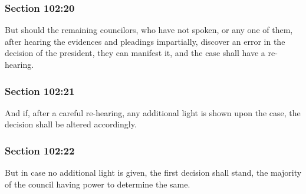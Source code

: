 	\subsubsection{Section 102:20} %
		\label{DC102-20}

		But should the remaining councilors, who have not spoken, or any one of them, after hearing the evidences and pleadings impartially, discover an error in the decision of the president, they can manifest it, and the case shall have a re-hearing.


	\subsubsection{Section 102:21} %
		\label{DC102-21}

		And if, after a careful re-hearing, any additional light is shown upon the case, the decision shall be altered accordingly.


	\subsubsection{Section 102:22} %
		\label{DC102-22}

		But in case no additional light is given, the first decision shall stand, the majority of the council having power to determine the same.


